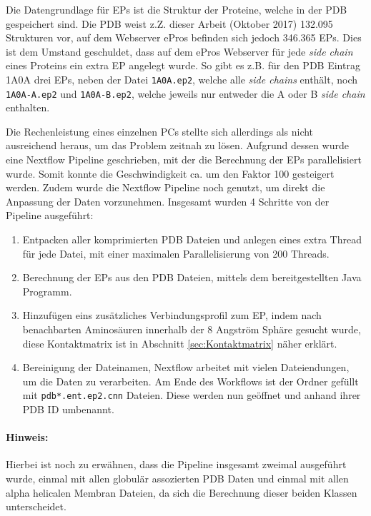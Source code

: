 Die Datengrundlage für \ac{EP}s ist die Struktur der Proteine, welche in der \ac{PDB} gespeichert sind. Die \ac{PDB} weist z.Z. dieser Arbeit (Oktober 2017) 132.095 Strukturen vor, auf dem Webserver ePros befinden sich jedoch 346.365 \ac{EP}s. Dies ist dem Umstand geschuldet, dass auf dem ePros Webserver für jede \emph{side chain} eines Proteins ein extra \ac{EP} angelegt wurde. So gibt es z.B. für den \ac{PDB} Eintrag 1A0A drei \ac{EP}s, neben der Datei \texttt{1A0A.ep2}, welche alle \emph{side chains} enthält, noch \texttt{1A0A-A.ep2} und \texttt{1A0A-B.ep2}, welche jeweils nur entweder die A oder B \emph{side chain} enthalten.

Die Rechenleistung eines einzelnen PCs stellte sich allerdings als nicht ausreichend heraus, um das Problem zeitnah zu lösen. Aufgrund dessen wurde eine Nextflow Pipeline geschrieben, mit der die Berechnung der \ac{EP}s  parallelisiert wurde. Somit konnte die Geschwindigkeit ca. um den Faktor 100 gesteigert werden. Zudem wurde die Nextflow Pipeline noch genutzt, um direkt die Anpassung der Daten vorzunehmen. Insgesamt wurden 4 Schritte von der Pipeline ausgeführt:

\begin{enumerate}
    \item
        Entpacken aller komprimierten \ac{PDB} Dateien und anlegen eines extra Thread für jede Datei, mit einer maximalen Parallelisierung von 200 Threads.
    \item 
        Berechnung der \ac{EP}s aus den \ac{PDB} Dateien, mittels dem bereitgestellten Java Programm.
    \item
        Hinzufügen eins zusätzliches Verbindungsprofil zum \ac{EP}, indem nach benachbarten Aminosäuren innerhalb der 8 Angström Sphäre gesucht wurde, diese Kontaktmatrix ist in Abschnitt \ref{sec:Kontaktmatrix} näher erklärt.
    \item
        Bereinigung der Dateinamen, Nextflow arbeitet mit vielen Dateiendungen, um die Daten zu verarbeiten. Am Ende des Workflows ist der Ordner gefüllt mit \texttt{pdb*.\-ent.\-ep2.\-cnn} Dateien. Diese werden nun geöffnet und anhand ihrer \ac{PDB} ID umbenannt.
\end{enumerate}

\paragraph{Hinweis:} Hierbei ist noch zu erwähnen, dass die Pipeline insgesamt zweimal ausgeführt wurde, einmal mit allen globulär assozierten \ac{PDB} Daten und einmal mit allen alpha helicalen Membran Dateien, da sich die Berechnung dieser beiden Klassen unterscheidet.

